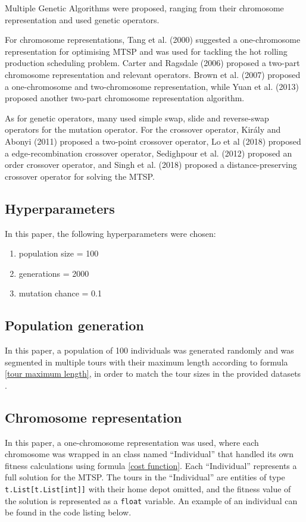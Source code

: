 \documentclass[conference]{IEEEtran}
\begin{document}
Multiple Genetic Algorithms were proposed, ranging from their chromosome representation and used genetic operators.

For chromosome representations, Tang et al. (2000) suggested a one-chromosome representation for optimising MTSP and was
used for tackling the hot rolling production scheduling problem. Carter and Ragsdale (2006) proposed a two-part chromosome
representation and relevant operators. Brown et al. (2007) proposed a one-chromosome and two-chromosome representation, while
Yuan et al. (2013) proposed another two-part chromosome representation algorithm.

As for genetic operators, many used simple swap, slide and reverse-swap operators for the mutation operator. For the crossover
operator, Király and Abonyi (2011) proposed a two-point crossover operator, Lo et al (2018) proposed a edge-recombination crossover
operator, Sedighpour et al. (2012) proposed an order crossover operator, and Singh et al. (2018) proposed a distance-preserving
crossover operator for solving the MTSP.

\subsection{Hyperparameters}
In this paper, the following hyperparameters were chosen:
\begin{enumerate}
    \item population size = 100
    \item generations = 2000
    \item mutation chance = 0.1
\end{enumerate}

\subsection{Population generation}
In this paper, a population of 100 individuals was generated randomly and was segmented in multiple tours with their maximum
length according to formula \ref{tour maximum length}, in order to match the tour sizes in the provided datasets \cite{b5}.

\subsection{Chromosome representation}
In this paper, a one-chromosome representation was used, where each chromosome was wrapped in an class named ``Individual''
that handled its own fitness calculations using formula \ref{cost function}. Each ``Individual'' represents a full solution
for the MTSP. The tours in the ``Individual'' are entities of type \texttt{t.List[t.List[int]]} with their home depot omitted,
and the fitness value of the solution is represented as a \texttt{float} variable. An example of an individual can be found
in the code listing below.
\end{document}
